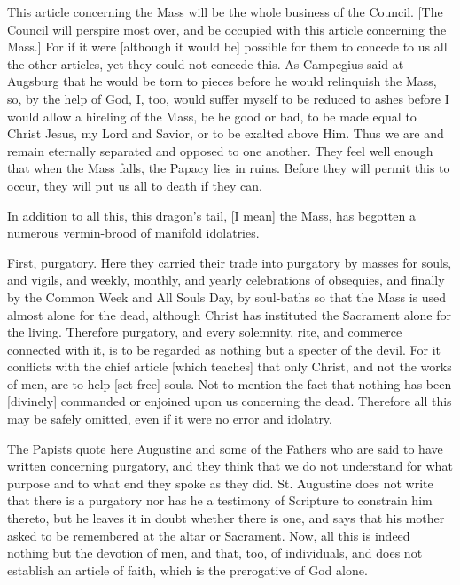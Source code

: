 This article concerning the Mass will be the whole business of
the Council. [The Council will perspire most over, and be
occupied with this article concerning the Mass.] For if it
were [although it would be] possible for them to concede to us
all the other articles, yet they could not concede this. As
Campegius said at Augsburg that he would be torn to pieces
before he would relinquish the Mass, so, by the help of God,
I, too, would suffer myself to be reduced to ashes before I
would allow a hireling of the Mass, be he good or bad, to be
made equal to Christ Jesus, my Lord and Savior, or to be
exalted above Him. Thus we are and remain eternally separated
and opposed to one another. They feel well enough that when
the Mass falls, the Papacy lies in ruins. Before they will
permit this to occur, they will put us all to death if they
can.

In addition to all this, this dragon's tail, [I mean] the
Mass, has begotten a numerous vermin-brood of manifold
idolatries.

First, purgatory. Here they carried their trade into purgatory
by masses for souls, and vigils, and weekly, monthly, and
yearly celebrations of obsequies, and finally by the Common
Week and All Souls Day, by soul-baths so that the Mass is used
almost alone for the dead, although Christ has instituted the
Sacrament alone for the living. Therefore purgatory, and every
solemnity, rite, and commerce connected with it, is to be
regarded as nothing but a specter of the devil. For it
conflicts with the chief article [which teaches] that only
Christ, and not the works of men, are to help [set free]
souls. Not to mention the fact that nothing has been
[divinely] commanded or enjoined upon us concerning the dead.
Therefore all this may be safely omitted, even if it were no
error and idolatry.

The Papists quote here Augustine and some of the Fathers who
are said to have written concerning purgatory, and they think
that we do not understand for what purpose and to what end
they spoke as they did. St. Augustine does not write that
there is a purgatory nor has he a testimony of Scripture to
constrain him thereto, but he leaves it in doubt whether there
is one, and says that his mother asked to be remembered at the
altar or Sacrament. Now, all this is indeed nothing but the
devotion of men, and that, too, of individuals, and does not
establish an article of faith, which is the prerogative of God
alone.

